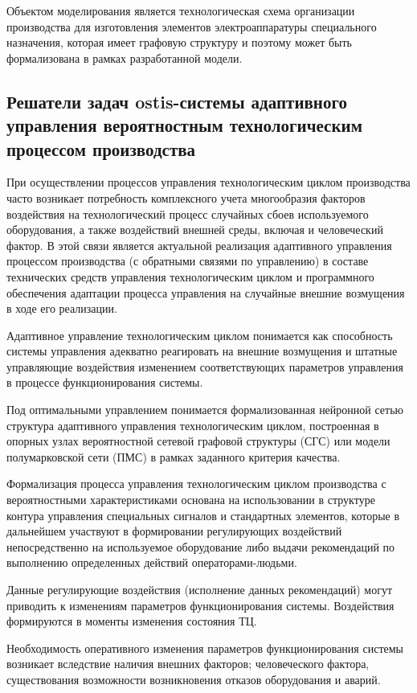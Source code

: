 Объектом моделирования является технологическая схема организации производства для изготовления элементов электроаппаратуры специального назначения, которая имеет графовую структуру и поэтому может быть формализована в рамках разработанной модели.


\subsection{Решатели задач ostis-системы адаптивного управления вероятностным технологическим процессом производства}

При осуществлении процессов управления технологическим циклом  производства часто возникает потребность комплексного учета многообразия факторов воздействия на технологический процесс случайных сбоев используемого оборудования, а также воздействий внешней среды, включая и человеческий фактор. В этой связи является актуальной реализация адаптивного  управления  процессом  производства (с обратными связями по управлению)  в  составе технических средств управления технологическим циклом и программного обеспечения адаптации процесса управления на случайные внешние возмущения в ходе его реализации.

Адаптивное управление технологическим циклом понимается как способность системы управления адекватно реагировать на внешние возмущения и штатные управляющие воздействия изменением соответствующих параметров управления в процессе функционирования системы.

Под оптимальными управлением понимается формализованная нейронной сетью структура адаптивного управления технологическим циклом, построенная в опорных узлах вероятностной сетевой графовой структуры (СГС) или модели полумарковской сети (ПМС) в рамках заданного критерия качества.

Формализация процесса управления технологическим циклом производства с  вероятностными характеристиками основана на использовании в структуре контура управления специальных сигналов и стандартных элементов, которые в дальнейшем участвуют в формировании регулирующих воздействий непосредственно на используемое оборудование либо выдачи рекомендаций по выполнению определенных действий операторами-людьми.

Данные регулирующие воздействия (исполнение данных рекомендаций) могут приводить к изменениям параметров функционирования системы. Воздействия формируются в моменты изменения состояния ТЦ.

Необходимость оперативного изменения параметров функционирования системы возникает вследствие наличия внешних факторов; человеческого фактора, существования возможности возникновения отказов оборудования и аварий.


